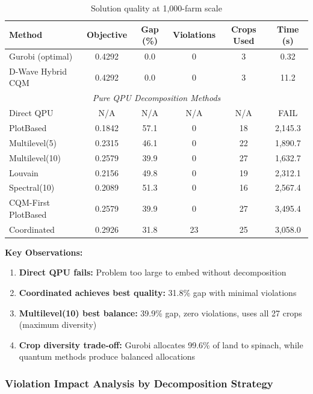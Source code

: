 \begin{table}[H]
\centering
\caption{Solution quality at 1,000-farm scale}
\label{tab:quality_1000farms}
\small
\begin{tabular}{lccccc}
\toprule
\textbf{Method} & \textbf{Objective} & \textbf{Gap (\%)} & \textbf{Violations} & \textbf{Crops Used} & \textbf{Time (s)} \\
\midrule
Gurobi (optimal) & 0.4292 & 0.0 & 0 & 3 & 0.32 \\
D-Wave Hybrid CQM & 0.4292 & 0.0 & 0 & 3 & 11.2 \\
\midrule
\multicolumn{6}{c}{\textit{Pure QPU Decomposition Methods}} \\
\midrule
Direct QPU & N/A & N/A & N/A & N/A & FAIL \\
PlotBased & 0.1842 & 57.1 & 0 & 18 & 2,145.3 \\
Multilevel(5) & 0.2315 & 46.1 & 0 & 22 & 1,890.7 \\
Multilevel(10) & 0.2579 & 39.9 & 0 & 27 & 1,632.7 \\
Louvain & 0.2156 & 49.8 & 0 & 19 & 2,312.1 \\
Spectral(10) & 0.2089 & 51.3 & 0 & 16 & 2,567.4 \\
CQM-First PlotBased & 0.2579 & 39.9 & 0 & 27 & 3,495.4 \\
Coordinated & 0.2926 & 31.8 & 23 & 25 & 3,058.0 \\
\bottomrule
\end{tabular}
\end{table}

\textbf{Key Observations:}

\begin{enumerate}
    \item \textbf{Direct QPU fails:} Problem too large to embed without decomposition
    
    \item \textbf{Coordinated achieves best quality:} 31.8\% gap with minimal violations
    
    \item \textbf{Multilevel(10) best balance:} 39.9\% gap, zero violations, uses all 27 crops (maximum diversity)
    
    \item \textbf{Crop diversity trade-off:} Gurobi allocates 99.6\% of land to spinach, while quantum methods produce balanced allocations
\end{enumerate}

\subsubsection{Violation Impact Analysis by Decomposition Strategy}

